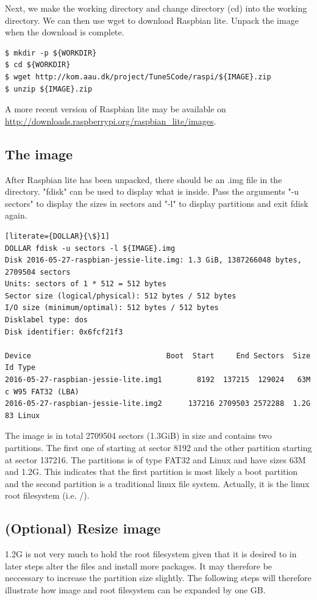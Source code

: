 Next, we make the working directory and change directory (cd) into the working
directory. We can then use wget to download Raspbian lite. Unpack the image
when the download is complete.

\begin{lstlisting}[]
$ mkdir -p ${WORKDIR}
$ cd ${WORKDIR}
$ wget http://kom.aau.dk/project/TuneSCode/raspi/${IMAGE}.zip
$ unzip ${IMAGE}.zip
\end{lstlisting}
\FloatBarrier

A more recent version of Raspbian lite may be available on 
\url{http://downloads.raspberrypi.org/raspbian_lite/images}.

\subsection{The image}

After Raspbian lite has been unpacked, there should be an .img file in the directory.
"fdisk" can be used to display what is inside. Pass the arguments "-u sectors" to
display the sizes in sectors and "-l" to display partitions and exit fdisk again.

\begin{lstlisting}[literate={DOLLAR}{\$}1]
DOLLAR fdisk -u sectors -l ${IMAGE}.img
Disk 2016-05-27-raspbian-jessie-lite.img: 1.3 GiB, 1387266048 bytes, 2709504 sectors
Units: sectors of 1 * 512 = 512 bytes
Sector size (logical/physical): 512 bytes / 512 bytes
I/O size (minimum/optimal): 512 bytes / 512 bytes
Disklabel type: dos
Disk identifier: 0x6fcf21f3

Device                               Boot  Start     End Sectors  Size Id Type
2016-05-27-raspbian-jessie-lite.img1        8192  137215  129024   63M  c W95 FAT32 (LBA)
2016-05-27-raspbian-jessie-lite.img2      137216 2709503 2572288  1.2G 83 Linux
\end{lstlisting}
\FloatBarrier

The image is in total 2709504 sectors (1.3GiB) in size and contains two
partitions. The first one of starting at sector 8192 and
the other partition starting at sector 137216. The partitions is of type FAT32
and Linux and have sizes 63M and 1.2G. This indicates that the first partition
is most likely a boot partition and the second partition is a traditional linux file
system. Actually, it is the linux root filesystem (i.e. /).

\subsection{(Optional) Resize image}
1.2G is not very much to hold the root filesystem given that it is desired to
in later steps alter the files and install more packages. It may therefore be
neccessary to increase the partition size slightly.
The following steps will therefore illustrate how image and root filesystem
can be expanded by one \ac{GB}.

